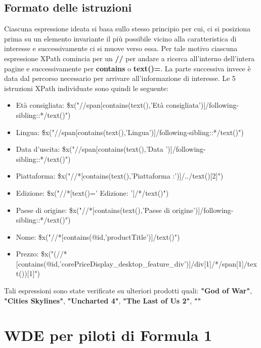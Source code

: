 \documentclass[12pt, letterpaper]{article}
\begin{document}
\subsection{Formato delle istruzioni}
Ciascuna espressione ideata si basa sullo stesso principio per cui, ci si posiziona prima su un elemento invariante il più possibile vicino alla caratteristica di interesse e successivamente ci si muove verso essa. Per tale motivo ciascuna espressione XPath comincia per un \textbf{//} per andare a ricerca all'interno dell'intera pagine e successivamente per \textbf{contains} o \textbf{text()=}. La parte successiva invece è data dal percorso necessario per arrivare all'informazione di interesse. Le 5 istruzioni XPath individuate sono quindi le seguente:
\begin{itemize}
    \item Età consigliata: \$x("//span[contains(text(),'Età consigliata')]/following-sibling::*/text()")
    \item Lingua: \$x("//span[contains(text(),'Lingua')]/following-sibling::*/text()")
    \item Data d'uscita: \$x("//span[contains(text(),'Data ')]/following-sibling::*/text()")
    \item Piattaforma: \$x("//*[contains(text(),'Piattaforma :')]/../text()[2]")
    \item Edizione: \$x("//*[text()=' Edizione: ']/*/text()")
    \item Paese di origine: \$x("//*[contains(text(),'Paese di origine')]/following-sibling::*/text()")
    \item Nome: \$x("//*[contains(@id,'productTitle')]/text()")
    \item Prezzo: \$x("(//*[contains(@id,'corePriceDisplay\_desktop\_feature\_div')]/div[1]/*/span[1]/text())[1]")
\end{itemize}
Tali espressioni sono state verificate su ulteriori prodotti quali: \textbf{"God of War"}, \textbf{"Cities Skylines"}, \textbf{"Uncharted 4"}, \textbf{"The Last of Us 2"}, \textbf{""}
\section{WDE per piloti di Formula 1}\label{sezione2}
\end{document}
